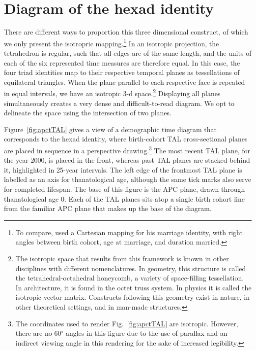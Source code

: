 \documentclass[12pt,oneside,a4paper,doublespacing]{article} %
\theoremstyle{definition}
\begin{document}
 \section{Diagram of the hexad identity}
 \label{sec:diagram}
 There are different ways to proportion this three dimensional construct,
of which we only present the isotropric mapping.\footnote{To compare,
\citet{lexis1875einleitung} used a Cartesian mapping for his marriage identity,
with right angles between birth cohort, age at marriage, and duration married.}
In an isotropic projection, the tetrahedron is regular, such that all edges are
of the same length, and the units of each of the six represented time measures
are therefore equal. In this case, the four triad identities map to
their respective temporal planes as tessellations of equilateral triangles. When
the plane parallel to each respective face is repeated in equal intervals, we
have an isotropic 3-d space.\footnote{The isotropic space that results from this framework is known in other disciplines with different nomenclatures. In geometry, this structure is called the tetrahedral-octahedral honeycomb, a variety of space-filling tessellation. In
architecture, it is found in the octet truss system. In physics it is called
the isotropic vector matrix. Constructs following this geometry exist in nature,
in other theoretical settings, and in man-made structures.}
Displaying all planes simultaneously creates a very dense and difficult-to-read
diagram. We opt to delineate the space using the intersection of two planes.

Figure~\ref{fig:apctTAL} gives a view of a demographic
time diagram that corresponds to the hexad identity, where birth-cohort TAL
cross-sectional planes are placed in sequence in a perspective drawing.\footnote{The coordinates used to render Fig.~\ref{fig:apctTAL} are isotropic.
However, there are no 60$^\circ$ angles in this figure due to the use of
parallax and an indirect viewing angle in this rendering for the sake of
increased legibility.} The most recent TAL plane, for the year 2000, is placed
in the front, whereas past TAL planes are stacked behind it, highlighted in
25-year intervals. The left edge of the frontmost TAL plane is labelled as an
axis for thanatological age, although the same tick marks also serve for
completed lifespan.
The base of this figure is the APC plane, drawn through thanatological age 0.
Each of the TAL planes sits atop a single birth cohort line from the familiar
APC plane that makes up the base of the diagram.
\end{document}
